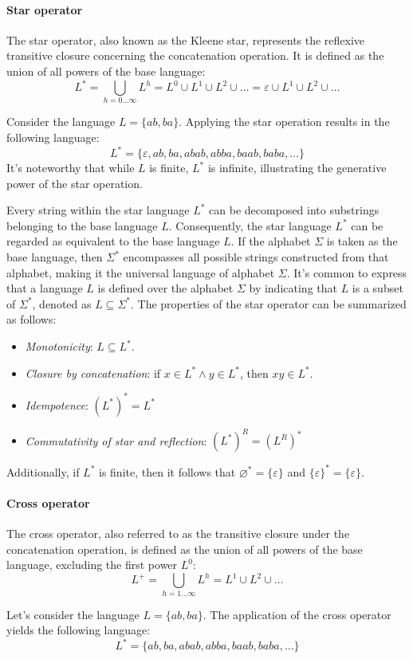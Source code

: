 \paragraph*{Star operator} 
The star operator, also known as the Kleene star, represents the reflexive transitive closure concerning the concatenation operation.
It is defined as the union of all powers of the base language:
\[L^{\ast}=\bigcup_{h=0\dots\infty}L^h=L^0 \cup L^1 \cup L^2 \cup \dots = \varepsilon \cup L^1 \cup L^2 \cup \dots\]
\begin{example}
    Consider the language $L=\{ab,ba\}$. 
    Applying the star operation results in the following language:
    \[L^{\ast}=\{\varepsilon, ab, ba, abab, abba, baab, baba, \dots\}\]
    It's noteworthy that while $L$ is finite, $L^{\ast}$ is infinite, illustrating the generative power of the star operation.
\end{example}
Every string within the star language $L^{\ast}$ can be decomposed into substrings belonging to the base language $L$.
Consequently, the star language $L^{\ast}$ can be regarded as equivalent to the base language $L$.
If the alphabet $\Sigma$ is taken as the base language, then $\Sigma^{\ast}$ encompasses all possible strings constructed from that alphabet, making it the universal language of alphabet $\Sigma$.
It's common to express that a language $L$ is defined over the alphabet $\Sigma$ by indicating that $L$ is a subset of $\Sigma^{\ast}$, denoted as $L \subseteq \Sigma^{\ast}$. 
The properties of the star operator can be summarized as follows:
\begin{itemize}
    \item \textit{Monotonicity}: $L \subseteq L^{\ast}$. 
    \item \textit{Closure by concatenation}: if $x \in L^{\ast} \land y \in L^{\ast}$, then $xy \in L^{\ast}$. 
    \item \textit{Idempotence}: $(L^{\ast})^{\ast}=L^{\ast}$
    \item \textit{Commutativity of star and reflection}: $(L^{\ast})^R=(L^R)^{\ast}$
\end{itemize}
Additionally, if $L^{\ast}$ is finite, then it follows that $\varnothing^{\ast}=\{\varepsilon\}$ and $\{\varepsilon\}^{\ast}=\{\varepsilon\}$. 

\paragraph*{Cross operator} 
The cross operator, also referred to as the transitive closure under the concatenation operation, is defined as the union of all powers of the base language, excluding the first power $L^0$:
\[L^{+}=\bigcup_{h=1\dots\infty}L^h=L^1 \cup L^2 \cup \dots\]
\begin{example}
    Let's consider the language $L=\{ab,ba\}$. 
    The application of the cross operator yields the following language:
    \[L^{\ast}=\{ab, ba, abab, abba, baab, baba, \dots\}\]
\end{example}

